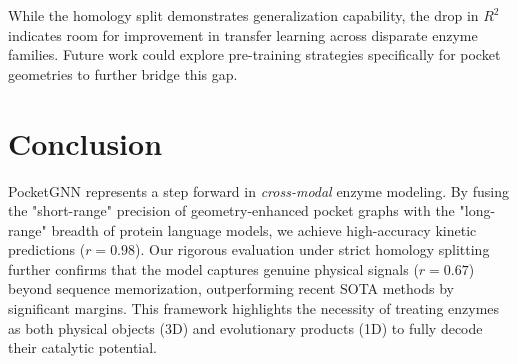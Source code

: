 \documentclass[11pt]{article}
\begin{document}
While the homology split demonstrates generalization capability, the drop in $R^2$ indicates room for improvement in transfer learning across disparate enzyme families. Future work could explore pre-training strategies specifically for pocket geometries to further bridge this gap.

\section{Conclusion}
\label{sec:conclusion}

PocketGNN represents a step forward in \emph{cross-modal} enzyme modeling. By fusing the "short-range" precision of geometry-enhanced pocket graphs with the "long-range" breadth of protein language models, we achieve high-accuracy kinetic predictions ($r=0.98$). Our rigorous evaluation under strict homology splitting further confirms that the model captures genuine physical signals ($r=0.67$) beyond sequence memorization, outperforming recent SOTA methods by significant margins. This framework highlights the necessity of treating enzymes as both physical objects (3D) and evolutionary products (1D) to fully decode their catalytic potential.
\end{document}
